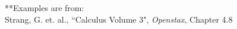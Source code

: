 \documentclass{article}
\begin{document}
\begin{itemize}
%
\end{itemize}
**Examples are from: \\
Strang, G. et. al., ``Calculus Volume 3", \emph{Openstax}, Chapter 4.8 
\end{document}
